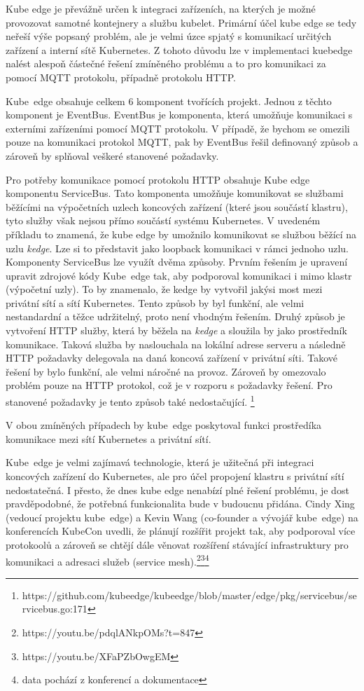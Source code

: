Kube edge je převážně určen k integraci zařízeních, na kterých je možné provozovat samotné kontejnery a službu kubelet. Primární účel kube edge se tedy neřeší výše popsaný problém, ale je velmi úzce spjatý s komunikací určitých zařízení a interní sítě Kubernetes. Z tohoto důvodu lze v implementaci kuebedge nalést alespoň částečné řešení zmíněného problému a to pro komunikaci za pomocí MQTT protokolu, případně protokolu HTTP.

Kube~edge obsahuje celkem 6 komponent tvořících projekt. Jednou z těchto komponent je EventBus. EventBus je komponenta, která umožňuje komunikaci s externími zařízeními pomocí MQTT protokolu. V případě, že bychom se omezili pouze na komunikaci protokol MQTT, pak by EventBus řešil definovaný způsob a zároveň by splňoval veškeré stanovené požadavky.

Pro potřeby komunikace pomocí protokolu HTTP obsahuje Kube edge komponentu ServiceBus. Tato komponenta umožňuje komunikovat se službami běžícími na výpočetních uzlech koncových zařízení (které jsou součástí klastru), tyto služby však nejsou přímo součástí systému Kubernetes. V uvedeném příkladu to znamená, že kube edge by umožnilo komunikovat se službou běžící na uzlu \textit{kedge}. Lze si to představit jako loopback komunikaci v rámci jednoho uzlu. Komponenty ServiceBus lze využít dvěma způsoby. Prvním řešením je upravení upravit zdrojové kódy Kube~edge tak, aby podporoval komunikaci i mimo klastr (výpočetní uzly). To by znamenalo, že kedge by vytvořil jakýsi most mezi privátní sítí a sítí Kubernetes. Tento způsob by byl funkční, ale velmi nestandardní a těžce udržitelný, proto není vhodným řešením. Druhý způsob je vytvoření HTTP služby, která by běžela na \textit{kedge} a sloužila by jako prostředník komunikace. Taková služba by naslouchala na lokální adrese serveru a následně HTTP požadavky delegovala na daná koncová zařízení v privátní síti. Takové řešení by bylo funkční, ale velmi náročné na provoz. Zároveň by omezovalo problém pouze na HTTP protokol, což je v rozporu s požadavky řešení. Pro stanovené požadavky je tento způsob také nedostačující. \footnote{https://github.com/kubeedge/kubeedge/blob/master/edge/pkg/servicebus/servicebus.go:171}

V obou zmíněných případech by kube~edge poskytoval funkci prostředíka komunikace mezi sítí Kubernetes a privátní sítí.

Kube~edge je velmi zajímavá technologie, která je užitečná při integraci koncových zařízení do Kubernetes, ale pro účel propojení klastru s privátní sítí nedostatečná. I přesto, že dnes kube edge nenabízí plné řešení problému, je dost pravděpodobné, že potřebná funkcionalita bude v budoucnu přidána. Cindy Xing (vedoucí projektu kube~edge) a Kevin Wang (co-founder a vývojář kube~edge) na konferencích KubeCon uvedli, že plánují rozšířit projekt tak, aby podporoval více protokoolů a zároveň se chtějí dále věnovat rozšíření stávající infrastruktury pro komunikaci a adresaci služeb (service mesh).\footnote{https://youtu.be/pdqlANkpOMs?t=847}\footnote{https://youtu.be/XFaPZbOwgEM}\footnote{data pochází z konferencí a dokumentace}

